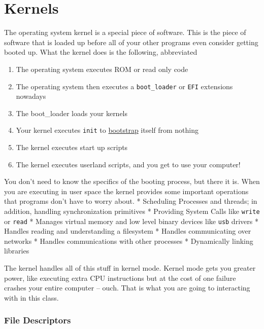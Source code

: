 \section{Kernels}\label{kernels}

The operating system kernel is a special piece of software. This is the
piece of software that is loaded up before all of your other programs
even consider getting booted up. What the kernel does is the following,
abbreviated

\begin{enumerate}
\def\labelenumi{\arabic{enumi}.}
\tightlist
\item
  The operating system executes ROM or read only code
\item
  The operating system then executes a \texttt{boot\_loader} or
  \texttt{EFI} extensions nowadays
\item
  The boot\_loader loads your kernels
\item
  Your kernel executes \texttt{init} to
  \href{https://en.wikipedia.org/wiki/Bootstrapping}{bootstrap} itself
  from nothing
\item
  The kernel executes start up scripts
\item
  The kernel executes userland scripts, and you get to use your
  computer!
\end{enumerate}

You don't need to know the specifics of the booting process, but there
it is. When you are executing in user space the kernel provides some
important operations that programs don't have to worry about. *
Scheduling Processes and threads; in addition, handling synchronization
primitives * Providing System Calls like \texttt{write} or \texttt{read}
* Manages virtual memory and low level binary devices like \texttt{usb}
drivers * Handles reading and understanding a filesystem * Handles
communicating over networks * Handles communications with other
processes * Dynamically linking libraries

The kernel handles all of this stuff in kernel mode. Kernel mode gets
you greater power, like executing extra CPU instructions but at the cost
of one failure crashes your entire computer -- ouch. That is what you
are going to interacting with in this class.

\subsubsection{File Descriptors}\label{file-descriptors}

